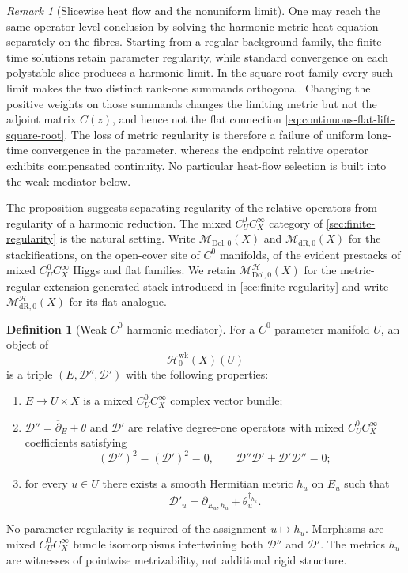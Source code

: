 \documentclass[11pt,reqno]{amsart}
\theoremstyle{definition}
\newtheorem{definition}[theorem]{Definition}
\theoremstyle{remark}
\newtheorem{remark}[theorem]{Remark}
\newcommand{\cD}{\mathcal D}
\newcommand{\cH}{\mathcal H}
\newcommand{\Dol}{\mathrm{Dol}}
\newcommand{\dR}{\mathrm{dR}}
\newcommand{\ddbar}{\overline\partial}
\begin{document}
\begin{remark}[Slicewise heat flow and the nonuniform limit]\label{rem:weak-mediator-heat-flow}
One may reach the same operator-level conclusion by solving the harmonic-metric heat equation separately on the fibres.  Starting from a regular background family, the finite-time solutions retain parameter regularity, while standard convergence on each polystable slice produces a harmonic limit.  In the square-root family every such limit makes the two distinct rank-one summands orthogonal.  Changing the positive weights on those summands changes the limiting metric but not the adjoint matrix $C(z)$, and hence not the flat connection \eqref{eq:continuous-flat-lift-square-root}.  The loss of metric regularity is therefore a failure of uniform long-time convergence in the parameter, whereas the endpoint relative operator exhibits compensated continuity.  No particular heat-flow selection is built into the weak mediator below.
\end{remark}

The proposition suggests separating regularity of the relative operators from regularity of a harmonic reduction.  The mixed $C^0_UC^\infty_X$ category of \cref{sec:finite-regularity} is the natural setting.  Write $\mathscr M_{\Dol,0}(X)$ and $\mathscr M_{\dR,0}(X)$ for the stackifications, on the open-cover site of $C^0$ manifolds, of the evident prestacks of mixed $C^0_UC^\infty_X$ Higgs and flat families.  We retain $\mathscr M_{\Dol,0}^{\cH}(X)$ for the metric-regular extension-generated stack introduced in \cref{sec:finite-regularity} and write $\mathscr M_{\dR,0}^{\cH}(X)$ for its flat analogue.

\begin{definition}[Weak $C^0$ harmonic mediator]\label{def:weak-C0-mediator}
For a $C^0$ parameter manifold $U$, an object of
\[
  \mathscr H^{\mathrm{wk}}_0(X)(U)
\]
is a triple $(E,\cD'',\cD')$ with the following properties:
\begin{enumerate}[label=(\roman*)]
\item $E\to U\times X$ is a mixed $C^0_UC^\infty_X$ complex vector bundle;
\item $\cD''=\ddbar_E+\theta$ and $\cD'$ are relative degree-one operators with mixed $C^0_UC^\infty_X$ coefficients satisfying
\[
  (\cD'')^2=(\cD')^2=0,
  \qquad
  \cD''\cD'+\cD'\cD''=0;
\]
\item for every $u\in U$ there exists a smooth Hermitian metric $h_u$ on $E_u$ such that
\[
  \cD'_u=\partial_{E_u,h_u}+\theta_u^{\dagger_{h_u}}.
\]
\end{enumerate}
No parameter regularity is required of the assignment $u\mapsto h_u$.  Morphisms are mixed $C^0_UC^\infty_X$ bundle isomorphisms intertwining both $\cD''$ and $\cD'$.  The metrics $h_u$ are witnesses of pointwise metrizability, not additional rigid structure.
\end{definition}
\end{document}
